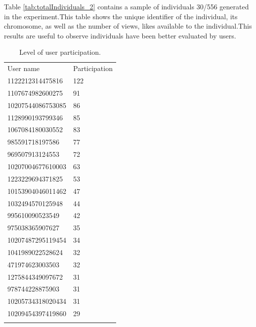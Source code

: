 Table \ref{tab:totalIndividuals_2} contains a sample of individuals 30/556
generated in the experiment.This table shows the unique identifier of the
individual, its chromosome, as well as the number of views, likes available to
the individual.This results are useful to observe individuals have been better
evaluated by users.

\begin{table}
\small
\caption{Level of user participation.}
\label{tab:userParticipation_2}
\centering
\small
\begin{tabular}{p{4cm} p{4cm}}
\hline\noalign{\smallskip}
 User name & Participation   \\
\noalign{\smallskip}\hline\noalign{\smallskip}
\small{1122212314475816} & \small{122} \\ \hline
\small{1107674982600275} & \small{91} \\ \hline
\small{10207544086753085} & \small{86} \\ \hline
\small{1128990193799346} & \small{85} \\ \hline
\small{1067084180030552} & \small{83} \\ \hline
\small{985591718197586} & \small{77} \\ \hline
\small{969507913124553} & \small{72} \\ \hline
\small{10207004677610003} & \small{63} \\ \hline
\small{1223229694371825} & \small{53} \\ \hline
\small{10153904046011462} & \small{47} \\ \hline
\small{1032494570125948} & \small{44} \\ \hline
\small{995610090523549} & \small{42} \\ \hline
\small{975038365907627} & \small{35} \\ \hline
\small{10207487295119454} & \small{34} \\ \hline
\small{1041989022528624} & \small{32} \\ \hline
\small{471974623003503} & \small{32} \\ \hline
\small{1275844349097672} & \small{31} \\ \hline
\small{978744228875903} & \small{31} \\ \hline
\small{10205734318020434} & \small{31} \\ \hline
\small{10209454397419860} & \small{29} \\ \hline


\noalign{\smallskip}\hline
\end{tabular}
\end{table}

